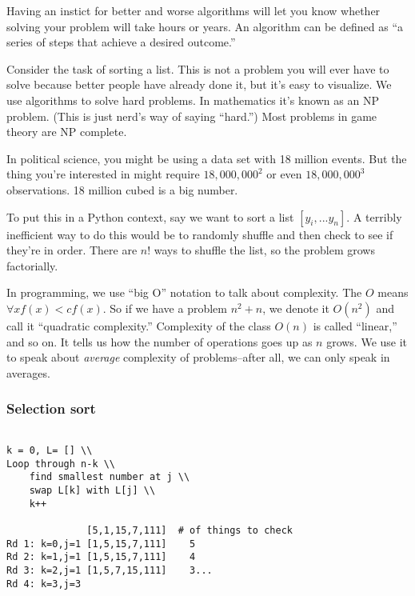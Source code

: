 \documentclass[12pt,letter]{article}
\begin{document}
Having an instict for better and worse algorithms will let you know
whether solving your problem will take hours or years.\footnotemark
{} An algorithm can
be defined as ``a series of steps that achieve a desired outcome.''

Consider the task of sorting a list. This is not a problem you will
ever have to solve because better people have already done it, but
it's easy to visualize. We use algorithms to solve hard problems. In
mathematics it's known as an NP problem. (This is just nerd's way of
saying ``hard.'') Most problems in game theory are NP complete. 

In political science, you might be using a data set with 18 million
events. But the thing you're interested in might require
$18,000,000^2$ or even $18,000,000^3$ observations. 18 million cubed
is a big number.

To put this in a Python context, say we want to sort a list $[y_i,
... y_n]$. A terribly inefficient way to do this would be to randomly
shuffle and then check to see if they're in order. There are $n!$ ways
to shuffle the list, so the problem grows factorially. 

In programming, we use ``big O'' notation to talk about
complexity. The $O$ means $\forall x f(x) < cf(x)$. So if we have a
problem $n^2 + n$, we denote it $O(n^2)$ and call it ``quadratic
complexity.'' Complexity of the class $O(n)$ is called ``linear,'' and
so on. It tells us how the number of operations goes up as $n$
grows. We use it to speak about \emph{average} complexity of
problems--after all, we can only speak in averages. 



\subsubsection{Selection sort}
\begin{verbatim}

k = 0, L= [] \\
Loop through n-k \\
    find smallest number at j \\
    swap L[k] with L[j] \\
    k++

              [5,1,15,7,111]  # of things to check
Rd 1: k=0,j=1 [1,5,15,7,111]    5
Rd 2: k=1,j=1 [1,5,15,7,111]    4
Rd 3: k=2,j=1 [1,5,7,15,111]    3...
Rd 4: k=3,j=3
\end{verbatim}
\end{document}
